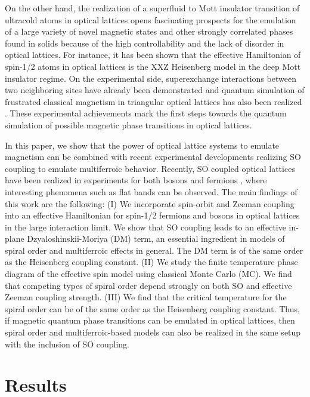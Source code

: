 \documentclass[a4paper,showpacs]{revtex4}
\begin{document}
On the other hand, the realization of a superfluid to Mott insulator
transition of ultracold atoms in optical lattices \cite{Greiner} opens
fascinating prospects \cite{blochreview} for the emulation of a large
variety of novel magnetic states \cite{Kuklov,Duan,Altman} and other
strongly correlated phases found in solids because of the high
controllability and the lack of disorder in optical lattices. For instance,
it has been shown \cite{Kuklov,Duan} that the effective Hamiltonian of
spin-1/2 atoms in optical lattices is the XXZ Heisenberg model in the deep
Mott insulator regime. On the experimental side, superexchange interactions
between two neighboring sites have already been demonstrated \cite{Trotzky}
and quantum simulation of frustrated classical magnetism in triangular optical
lattices has also been realized \cite{Struck}. These experimental
achievements mark the first steps towards the quantum simulation of possible
magnetic phase transitions in optical lattices.

In this paper, we show that the power of optical lattice systems to emulate
magnetism can be combined with recent experimental developments \cite%
{NIST,Pan,Zhangjing1,Zhangjing2} realizing SO coupling to emulate
multiferroic behavior. Recently, SO coupled optical lattices have been
realized in experiments for both bosons \cite{Ian} and fermions \cite%
{Zwierwei}, where interesting phenomena such as flat bands \cite%
{Zwierwei,Yongping1,Lin1} can be observed. The main findings of this work are
the following: (I) We incorporate spin-orbit and Zeeman
coupling into an effective Hamiltonian for spin-1/2 fermions and bosons
in optical lattices in the large interaction limit. We show that SO coupling
leads to an effective in-plane Dzyaloshinskii-Moriya (DM) term, an essential
ingredient in models of spiral order and multiferroic effects in general.
The DM term is of the same order as the Heisenberg coupling constant. (II)
We study the finite temperature phase diagram of the effective spin model 
using classical Monte Carlo (MC). We find that competing types of spiral
order depend strongly on both SO and effective Zeeman coupling strength. (III) 
We find that the critical temperature for the spiral order can
be of the same order as the Heisenberg coupling constant. Thus, if magnetic
quantum phase transitions can be emulated in optical lattices, then spiral
order and multiferroic-based models can also be realized in the same setup with the
inclusion of SO coupling.

\section*{\bf Results}
\label{results}
\end{document}
